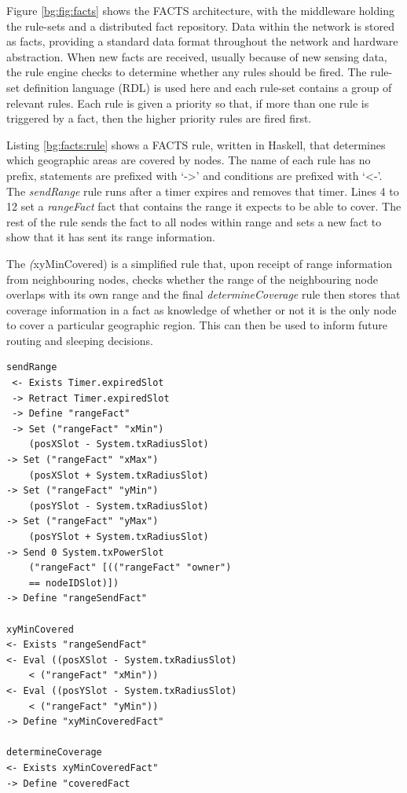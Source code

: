		Figure \ref{bg:fig:facts} shows the FACTS architecture, with the middleware holding the rule-sets and a distributed fact repository. Data within the network is stored as facts, providing a standard data format throughout the network and hardware abstraction. When new facts are received, usually because of new sensing data, the rule engine checks to determine whether any rules should be fired. The rule-set definition language (RDL) is used here and each rule-set contains a group of relevant rules. Each rule is given a priority so that, if more than one rule is triggered by a fact, then the higher priority rules are fired first.

		Listing \ref{bg:facts:rule} shows a FACTS rule, written in Haskell, that determines which geographic areas are covered by nodes. The name of each rule has no prefix, statements are prefixed with `->' and conditions are prefixed with `<-'. The \textit{sendRange} rule runs after a timer expires and removes that timer. Lines 4 to 12 set a \textit{rangeFact} fact that contains the range it expects to be able to cover. The rest of the rule sends the fact to all nodes within range and sets a new fact to show that it has sent its range information. 

		The \textit(xyMinCovered) is a simplified rule that, upon receipt of range information from neighbouring nodes, checks whether the range of the neighbouring node overlaps with its own range and the final \textit{determineCoverage} rule then stores that coverage information in a fact as knowledge of whether or not it is the only node to cover a particular geographic region. This can then be used to inform future routing and sleeping decisions.
\vspace{\baselineskip}
		\begin{lstlisting}[caption={Coverage Algorithm in FACTS Rules}, label={bg:facts:rule}]
 sendRange
 <- Exists Timer.expiredSlot
 -> Retract Timer.expiredSlot 
 -> Define "rangeFact"
 -> Set ("rangeFact" "xMin")
	(posXSlot - System.txRadiusSlot)
-> Set ("rangeFact" "xMax") 
	(posXSlot + System.txRadiusSlot)
-> Set ("rangeFact" "yMin")
	(posYSlot - System.txRadiusSlot)
-> Set ("rangeFact" "yMax")
	(posYSlot + System.txRadiusSlot)
-> Send 0 System.txPowerSlot 
	("rangeFact" [(("rangeFact" "owner")
	== nodeIDSlot)])
-> Define "rangeSendFact"

xyMinCovered
<- Exists "rangeSendFact"
<- Eval ((posXSlot - System.txRadiusSlot)
	< ("rangeFact" "xMin"))
<- Eval ((posYSlot - System.txRadiusSlot)
	< ("rangeFact" "yMin"))
-> Define "xyMinCoveredFact" 

determineCoverage
<- Exists xyMinCoveredFact"
-> Define "coveredFact
		\end{lstlisting}

